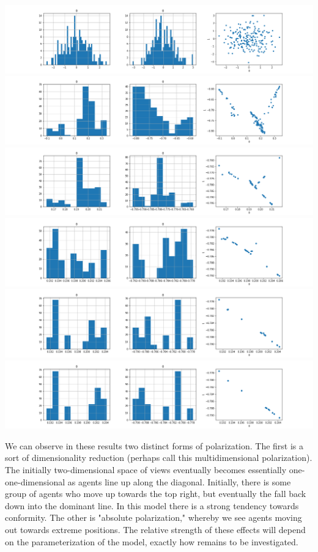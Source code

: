 \documentclass{article}
\begin{document}
\begin{center}

\includegraphics[width=\linewidth]{200_10_0_2_1.png}
\includegraphics[width=\linewidth]{200_10_0_2_11.png}
\includegraphics[width=\linewidth]{200_10_0_2_21.png}
\includegraphics[width=\linewidth]{200_10_0_2_31.png}
\includegraphics[width=\linewidth]{200_10_0_2_41.png}
\includegraphics[width=\linewidth]{200_10_0_2_51.png}
    
\end{center}

We can observe in these results two distinct forms of polarization. The first is a sort of dimensionality reduction (perhaps call this multidimensional polarization). The initially two-dimensional space of views eventually becomes essentially one-one-dimensional as agents line up along the diagonal. Initially, there is some group of agents who move up towards the top right, but eventually the fall back down into the dominant line. In this model there is a strong tendency towards conformity. The other is "absolute polarization," whereby we see agents moving out towards extreme positions. The relative strength of these effects will depend on the parameterization of the model, exactly how remains to be investigated.
\end{document}
